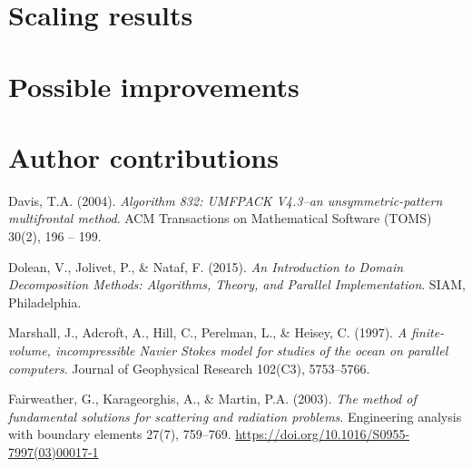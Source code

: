 \documentclass{article}
\begin{document}
	
	\section{Scaling results}
	
	\section{Possible improvements}
	
	\section{Author contributions}
	
	\begin{thebibliography}{9}
		Davis, T.A.
		(2004).
		\emph{Algorithm 832: UMFPACK V4.3--an unsymmetric-pattern multifrontal method}.
		ACM Transactions on Mathematical Software (TOMS)
		30(2), 196 -- 199.
		
		Dolean, V., Jolivet, P., \& Nataf, F.
		(2015).
		\emph{An Introduction to Domain Decomposition Methods: Algorithms, Theory, and Parallel Implementation}.
		SIAM, Philadelphia.
		
		Marshall, J., Adcroft, A., Hill, C., Perelman, L., \& Heisey, C.
		(1997).
		\emph{A finite-volume, incompressible Navier Stokes model for studies of the ocean on parallel computers}.
		Journal of Geophysical Research 
		102(C3), 5753--5766.
		
		Fairweather, G., Karageorghis, A., \& Martin, P.A.
		(2003).
		\emph{The method of fundamental solutions for scattering and radiation problems}.
		Engineering analysis with boundary elements   
		27(7), 759--769.
		\url{https://doi.org/10.1016/S0955-7997(03)00017-1}
	\end{thebibliography}
\end{document}
